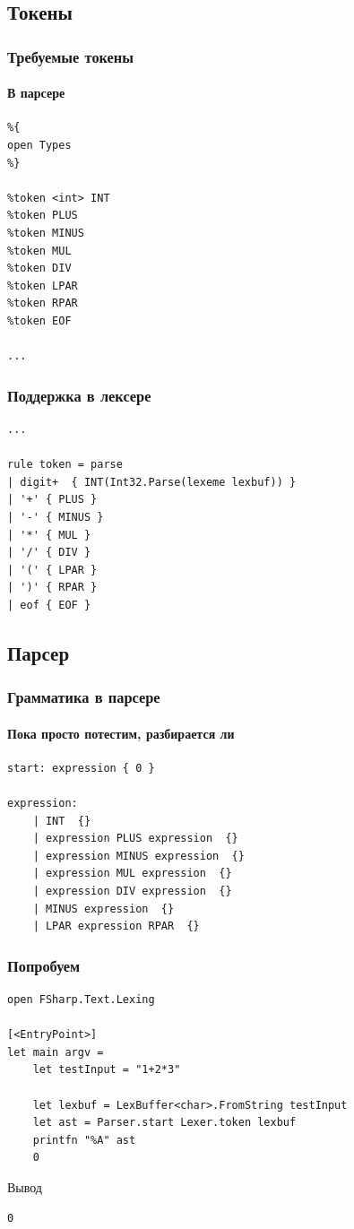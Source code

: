 \documentclass{../../slides-style}
\begin{document}
    \subsection{Токены}

    \begin{frame}[fragile]
        \frametitle{Требуемые токены}
        \framesubtitle{В парсере}
        \begin{verbatim}
%{
open Types
%}

%token <int> INT
%token PLUS
%token MINUS
%token MUL
%token DIV
%token LPAR
%token RPAR
%token EOF

...
        \end{verbatim}
    \end{frame}

    \begin{frame}[fragile]
        \frametitle{Поддержка в лексере}
        \begin{verbatim}
...

rule token = parse
| digit+  { INT(Int32.Parse(lexeme lexbuf)) }
| '+' { PLUS }
| '-' { MINUS }
| '*' { MUL }
| '/' { DIV }
| '(' { LPAR }
| ')' { RPAR }
| eof { EOF }
        \end{verbatim}
    \end{frame}

    \subsection{Парсер}

    \begin{frame}[fragile]
        \frametitle{Грамматика в парсере}
        \framesubtitle{Пока просто потестим, разбирается ли}
        \begin{verbatim}
start: expression { 0 }

expression:
    | INT  {}
    | expression PLUS expression  {}
    | expression MINUS expression  {}
    | expression MUL expression  {}
    | expression DIV expression  {}
    | MINUS expression  {}
    | LPAR expression RPAR  {}
        \end{verbatim}
    \end{frame}

    \begin{frame}[fragile]
        \frametitle{Попробуем}
        \begin{verbatim}
open FSharp.Text.Lexing

[<EntryPoint>]
let main argv =
    let testInput = "1+2*3"

    let lexbuf = LexBuffer<char>.FromString testInput
    let ast = Parser.start Lexer.token lexbuf
    printfn "%A" ast
    0 
        \end{verbatim}
        \begin{exampleblock}{Вывод}
            \begin{verbatim}
0
            \end{verbatim}
        \end{exampleblock}
    \end{frame}
\end{document}
